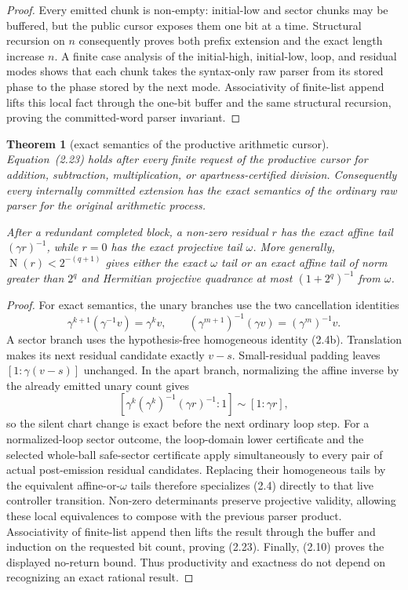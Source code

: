 \documentclass[10pt]{article}
\newtheorem{theorem}{Theorem}[section]
\theoremstyle{definition}
\theoremstyle{remark}
\newcommand{\Norm}{\operatorname{N}}
\newcommand{\Proj}[2]{[#1:#2]}
\begin{document}
\begin{proof}
Every emitted chunk is non-empty: initial-low and sector chunks may be
buffered, but the public cursor exposes them one bit at a time.  Structural
recursion on $n$ consequently proves both prefix extension and the exact
length increase $n$.  A finite case analysis of the initial-high,
initial-low, loop, and residual modes shows that each chunk takes the
syntax-only raw parser from its stored phase to the phase stored by the next
mode.  Associativity of finite-list append lifts this local fact through the
one-bit buffer and the same structural recursion, proving the committed-word
parser invariant.
\end{proof}

\begin{theorem}[exact semantics of the productive arithmetic cursor]
\label{thm:ccl-arithmetic-productive}
Equation~(2.23) holds after every finite request of the productive cursor for
addition, subtraction, multiplication, or apartness-certified division.
Consequently every internally committed extension has the exact semantics of
the ordinary raw parser for the original arithmetic process.

After a redundant completed block, a non-zero residual $r$ has the exact
affine tail $(\gamma r)^{-1}$, while $r=0$ has the exact projective tail
$\omega$.  More generally, $\Norm(r)<2^{-(q+1)}$ gives either the exact
$\omega$ tail or an exact affine tail of norm greater than $2^q$ and
Hermitian projective quadrance at most $(1+2^q)^{-1}$ from $\omega$.
\end{theorem}

\begin{proof}
For exact semantics, the unary branches use the two cancellation identities
\[
 \gamma^{k+1}(\gamma^{-1}v)=\gamma^kv,
 \qquad
 (\gamma^{m+1})^{-1}(\gamma v)=(\gamma^m)^{-1}v.
\]
A sector branch uses the hypothesis-free homogeneous identity (2.4b).
Translation makes its next residual candidate exactly $v-s$.  Small-residual
padding leaves $\Proj{1}{\gamma(v-s)}$ unchanged.  In the apart branch,
normalizing the affine inverse by the already emitted unary count gives
\[
 \Proj{\gamma^k(\gamma^k)^{-1}(\gamma r)^{-1}}{1}
 \sim\Proj{1}{\gamma r},
\]
so the silent chart change is exact before the next ordinary loop step.
For a normalized-loop sector outcome, the loop-domain lower certificate and
the selected whole-ball safe-sector certificate apply simultaneously to
every pair of actual post-emission residual candidates.  Replacing their
homogeneous tails by the equivalent affine-or-$\omega$ tails therefore
specializes (2.4) directly to that live controller transition.
Non-zero determinants preserve projective validity, allowing these local
equivalences to compose with the previous parser product.  Associativity of
finite-list append then lifts the result through the buffer and induction on
the requested bit count, proving (2.23).  Finally, (2.10) proves the displayed
no-return bound.  Thus productivity and exactness do not depend on recognizing
an exact rational result.
\end{proof}
\end{document}
